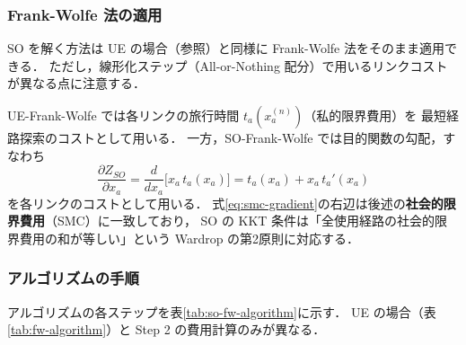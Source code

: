 \subsubsection*{Frank-Wolfe 法の適用}

SO を解く方法は UE の場合（参照）と同様に
Frank-Wolfe 法をそのまま適用できる\cite{FrankWolfe1956}．
ただし，線形化ステップ（All-or-Nothing 配分）で用いるリンクコストが異なる点に注意する．

UE-Frank-Wolfe では各リンクの旅行時間 $t_a(x_a^{(n)})$（私的限界費用）を
最短経路探索のコストとして用いる\cite{土木学会1998}．
一方，SO-Frank-Wolfe では目的関数の勾配，すなわち
\begin{equation}
  \frac{\partial Z_{SO}}{\partial x_a}
  = \frac{d}{dx_a}\bigl[x_a\, t_a(x_a)\bigr]
  = t_a(x_a) + x_a\, t_a'(x_a)
  \label{eq:smc-gradient}
\end{equation}
を各リンクのコストとして用いる．
式\eqref{eq:smc-gradient}の右辺は後述の\textbf{社会的限界費用}（SMC）に一致しており，
SO の KKT 条件は「全使用経路の社会的限界費用の和が等しい」という
Wardrop の第2原則に対応する．

\subsubsection*{アルゴリズムの手順}

アルゴリズムの各ステップを表\ref{tab:so-fw-algorithm}に示す．
UE の場合（表\ref{tab:fw-algorithm}）と Step 2 の費用計算のみが異なる．

